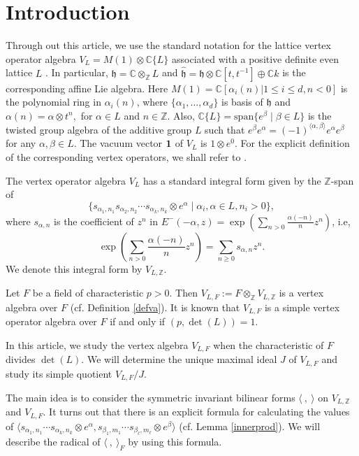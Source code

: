 \documentclass[12pt]{article}
\def\a{\alpha}
\def\b{\beta}
\def\CC{{\mathbb C}}
\def\ZZ{{\mathbb Z}}
\def\la{\langle}
\def\ra{\rangle}
\def\vac{\hbox{\bf 1}} %
\begin{document}
\section{Introduction}
Through out this article, we use the standard notation for the lattice vertex operator algebra $V_L = M(1) \otimes \CC\{L\}$ associated with a positive definite even lattice $L$  \cite{FLM}. In particular,
${\mathfrak h}=\CC\otimes_{\ZZ} L$  and  $\hat {\mathfrak{h}}={\mathfrak h}\otimes \CC[t,t^{-1}]\oplus \CC k$ is the corresponding affine Lie
algebra. Here $M(1)=\CC[\a_i(n)|1\leq i\leq d, n<0]$ is the polynomial ring in $\a_i(n)$,  where $\{\a_1,
\dots,\a_d\}$  is basis of $\mathfrak{h}$ and $\a(n)=\a\otimes t^n,$ for $\alpha\in L$ and $n\in \ZZ$.  Also, $\CC\{L\}=\mathrm{span}
\{e^{\beta}\mid \beta\in L\}$ is the twisted group algebra of the additive group
$L$ such that $e^\b e^\a=(-1)^{\la \a, \b\ra} e^\a e^\b$ for any $\a, \b\in L$.
The vacuum vector $\vac$  of $V_L$ is $1\otimes e^0$.  For
the explicit definition of the corresponding vertex operators, we shall refer to
\cite{FLM}. 



The vertex operator algebra $V_L$ has a standard integral form \cite{ivoa,Pro} given by 
the $\ZZ$-span of
\[
\{ s_{\alpha_1,n_1}s_{\alpha_2,n_2} \cdots s_{\alpha_k,n_k}\otimes e^\alpha \mid \alpha_i, \alpha\in L , n_i >0\}, 
\]
where $s_{\alpha, n}$ is the coefficient of $z^n$ in
$E^-(-\alpha, z) = \exp( \sum_{n>0} \frac{\alpha(-n)}{n} z^n)$, i.e,
\[
\exp\left( \sum_{n>0} \frac{\alpha(-n)}{n} z^n\right) = \sum_{n\geq 0} s_{\alpha,n}z^n.
\]
We denote this integral form by $V_{L,\ZZ} $.    
 
Let $F$ be a field of characteristic $p>0$. Then  $V_{L,F}:= F\otimes_\ZZ V_{L,\ZZ}$ is a vertex algebra over $F$ (cf. Definition \ref{defva}).  It is known \cite{Mu} that $V_{L,F}$ is a simple vertex operator algebra over $F$ if and only if $(p, \det(L))=1$.  

In this article, we study the  vertex algebra $V_{L,F}$ when the characteristic of $F$ divides $\det(L)$. We will determine the unique maximal ideal $J$ of $V_{L,F}$ and study its simple quotient
 $V_{L,F}/J$. 
 
The main idea is to consider the symmetric invariant bilinear forms $\langle\ , \ \rangle $ on 
$ V_{L,\ZZ}$ and $V_{L,F}$.  
It turns out that there is an explicit formula for calculating the values of 
$\langle s_{\alpha_1,n_1}\cdots s_{\alpha_k,n_k}\otimes e^\alpha, s_{\beta_1,m_1} \cdots s_{\beta_\ell,m_\ell}\otimes e^{\beta}\rangle$ (cf. Lemma \ref{innerprod}).  
We will  describe the radical of $\langle\ , \ \rangle_F$ by using this formula. 
\end{document}
